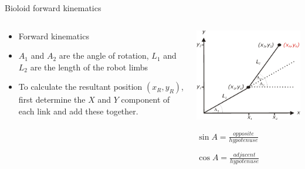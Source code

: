 \documentclass[compress]{beamer}
\begin{document}
\begin{frame}{Bioloid forward kinematics}

    \begin{columns}
        \begin{column}{0.5\linewidth}
    \begin{itemize}

        \item Forward kinematics
        \item $A_1$ and $A_2$ are the angle of rotation, $L_1$ and
            $L_2$ are the length of the robot limbs
        \item To calculate the resultant position $(x_R, y_R)$, first
            determine the $X$ and $Y$ component of each link and add these together.
    \end{itemize}
            
        \end{column}
        \begin{column}{0.5\linewidth}

            \begin{center}
                \includegraphics[width=\linewidth]{image32}
            \end{center}

            $\sin A = \frac{opposite}{hypotenuse}$

            $\cos A = \frac{adjacent}{hypotenuse}$

        \end{column}
    \end{columns}


\end{frame}
\end{document}
